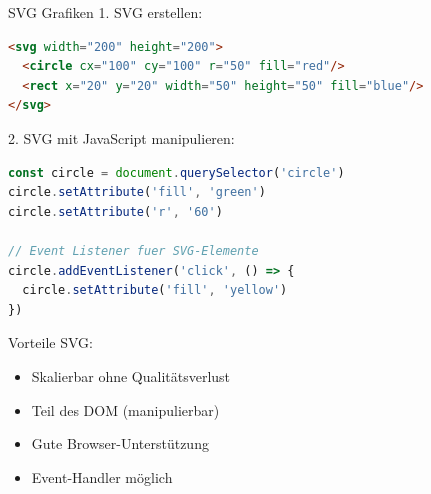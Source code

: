 \begin{KR}{SVG Grafiken}
1. SVG erstellen:
\begin{lstlisting}[language=HTML, style=basesmol]
<svg width="200" height="200">
  <circle cx="100" cy="100" r="50" fill="red"/>
  <rect x="20" y="20" width="50" height="50" fill="blue"/>
</svg>
\end{lstlisting}

2. SVG mit JavaScript manipulieren:
\begin{lstlisting}[language=JavaScript, style=basesmol]
const circle = document.querySelector('circle')
circle.setAttribute('fill', 'green')
circle.setAttribute('r', '60')

// Event Listener fuer SVG-Elemente
circle.addEventListener('click', () => {
  circle.setAttribute('fill', 'yellow')
})
\end{lstlisting}

Vorteile SVG:
\begin{itemize}
  \item Skalierbar ohne Qualitätsverlust
  \item Teil des DOM (manipulierbar)
  \item Gute Browser-Unterstützung
  \item Event-Handler möglich
\end{itemize}
\end{KR}

